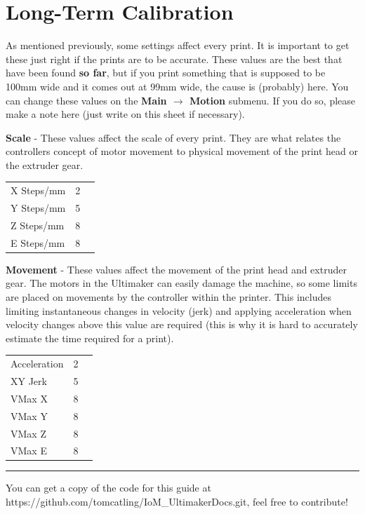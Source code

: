 \documentclass[a4paper,12pt]{article}
\begin{document}
{\section*{Long-Term Calibration}
As mentioned previously, some settings affect every print. It is important to get these just right if the prints are to be 
accurate. These values are the best that have been found \textbf{so far}, but if you print something that is supposed to be 100mm wide and 
it comes out at 99mm wide, the cause is (probably) here. You can change these values on the \textbf{Main $\rightarrow$ Motion} submenu. If you do so, please
make a note here (just write on this sheet if necessary).

\vspace*{2mm}
\noindent \textbf{Scale} - These values affect the scale of every print. They are what relates the controllers concept of motor movement to physical movement of the print head
or the extruder gear.

\begin{center}
\begin{tabular}{ l c r }
  X Steps/mm & 2 \\
  Y Steps/mm & 5 \\
  Z Steps/mm & 8 \\
  E Steps/mm & 8 \\
\end{tabular}
\end{center}

\vspace*{2mm}
\noindent \textbf{Movement} - These values affect the movement of the print head and extruder gear. The motors in the Ultimaker can easily damage the machine, so some limits are placed on movements
by the controller within the printer. This includes limiting instantaneous changes in velocity (jerk) and applying acceleration when velocity changes above this value are required (this is why it is hard to 
accurately estimate the time required for a print).

\begin{center}
\begin{tabular}{ l c r }
  Acceleration & 2 \\
  XY Jerk & 5 \\
  VMax X & 8 \\
  VMax Y & 8 \\
  VMax Z & 8 \\
  VMax E & 8 \\
\end{tabular}
\end{center}

\vfill

\hrule
\vspace*{1mm}
\noindent You can get a copy of the code for this guide at https://github.com/tomcatling/IoM\_UltimakerDocs.git, feel free to contribute!

}
\end{document}
